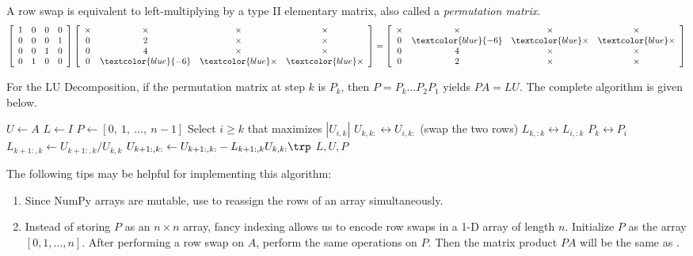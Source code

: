 A row swap is equivalent to left-multiplying by a type II elementary matrix, also called a \emph{permutation matrix}.
%
\begin{align*}
\left[\begin{array}{cccc}
1 & 0 & 0 & 0 \\
0 & 0 & 0 & 1 \\
0 & 0 & 1 & 0 \\
0 & 1 & 0 & 0 \\
\end{array}\right]
\left[\begin{array}{cccc}
\times & \times & \times & \times\\
0 & 2 & \times & \times\\
0 & 4 & \times & \times\\
0 & \textcolor{blue}{-6} & \textcolor{blue}\times & \textcolor{blue}\times\\
\end{array}\right]
=
\left[\begin{array}{cccc}
\times & \times & \times & \times\\
0 & \textcolor{blue}{-6} & \textcolor{blue}\times & \textcolor{blue}\times\\
0 & 4 & \times & \times\\
0 & 2 & \times & \times\\
\end{array}\right]
\end{align*}

For the LU Decomposition, if the permutation matrix at step $k$ is $P_k$, then $P = P_k\ldots P_2P_1$ yields $PA = LU$.
The complete algorithm is given below.

\begin{algorithm}[H]
\begin{algorithmic}[1]
\State $U \gets A$
\State $L \gets I$
\State $P \gets [0,\ 1,\ \ldots,\ n-1]$
    \State Select $i \ge k$ that maximizes $|U_{i,k}|$
    \State $U_{k,k:} \leftrightarrow U_{i,k:}$ (swap the two rows)
    \State $L_{k,:k} \leftrightarrow L_{i,:k}$
    \State $P_{k} \leftrightarrow P_{i}$
    \State $L_{k+1:,k} \gets U_{k+1:,k}/U_{k,k}$
    \State $U_{k+1:,k:} \gets U_{k+1:,k:} - L_{k+1:,k}U_{k,k:}\trp$
\EndFor
\State {} $L, U, P$
\EndProcedure
\end{algorithmic}
\caption{}
\end{algorithm}

The following tips may be helpful for implementing this algorithm:
\begin{enumerate}
    \item Since NumPy arrays are mutable, use  to reassign the rows of an array simultaneously.
    \item Instead of storing $P$ as an $n \times n$ array, fancy indexing allows us to encode row swaps in a 1-D array of length $n$.
    Initialize $P$ as the array $[0, 1, \ldots, n]$.
    After performing a row swap on $A$, perform the same operations on $P$.
    Then the matrix product $PA$ will be the same as .
\end{enumerate}


